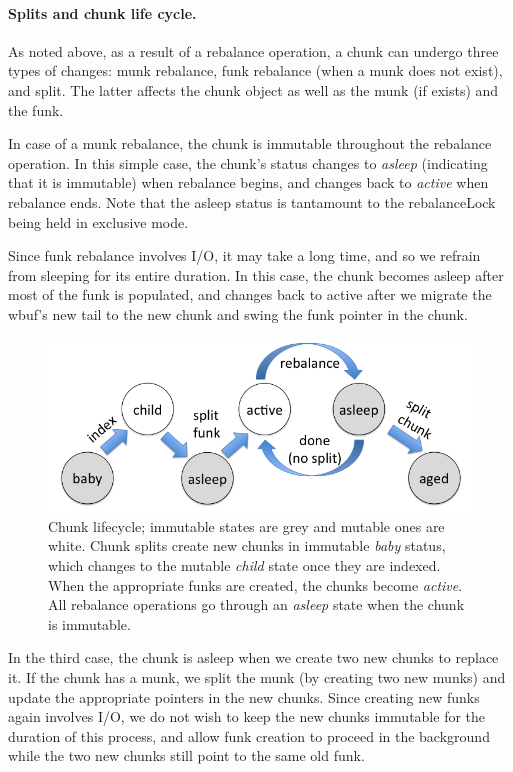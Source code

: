 \paragraph{Splits and chunk life cycle.}

As noted above, as a result of a rebalance operation, a chunk can undergo three types of changes: munk rebalance, funk rebalance
(when a munk does not exist), and split. The latter affects the chunk object as well as the munk (if exists) and the funk.

In case of a munk rebalance, the chunk is immutable throughout the rebalance operation.
In this simple case, the chunk's status changes to \emph{asleep} (indicating that it is immutable)
when rebalance begins, and changes back to \emph{active} when rebalance ends. 
Note that the asleep status is tantamount to the rebalanceLock being held in exclusive mode.

Since funk rebalance involves I/O, it may take a long time, and so we  refrain from sleeping for its entire 
duration. In this case, the chunk becomes asleep after most of the funk is populated, and 
changes back to active after we 
migrate the wbuf's new tail to the new chunk and swing the funk pointer in the chunk.


\begin{figure}[htb]
\centerline{
\includegraphics[width=\columnwidth]{state-diagram.png}
}
\caption{Chunk lifecycle; immutable states are grey and mutable ones are white.
Chunk splits  create new chunks in immutable \emph{baby} status, which changes to the mutable \emph{child} state once they 
are indexed. When the appropriate funks are created, the chunks become \emph{active}. All rebalance operations go through an 
\emph{asleep} state when the chunk is immutable.}
\label{fig:status}
\end{figure}

In the third case, the chunk is asleep when we create two new chunks to replace it. 
If the chunk has a munk, we split the munk (by creating two new munks) and update the appropriate pointers in the new chunks.  
Since creating new funks again involves I/O, we do not wish to keep the new chunks immutable for the duration of this process,
and allow funk creation to proceed in the background while the two new chunks still point to the same old funk. 


